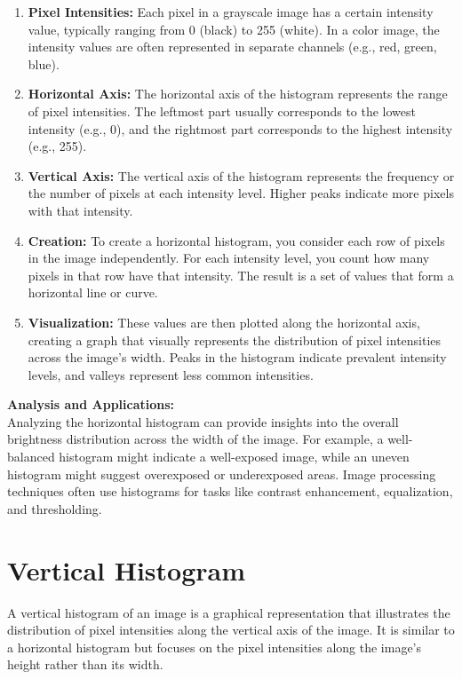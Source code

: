 \documentclass[9pt,twocolumn]{paper-template}
\begin{document}
\begin{enumerate}
	\item \textbf{Pixel Intensities:} Each pixel in a grayscale image has a certain intensity value, typically ranging from 0 (black) to 255 (white). In a color image, the intensity values are often represented in separate channels (e.g., red, green, blue).
	
	\item \textbf{Horizontal Axis:} The horizontal axis of the histogram represents the range of pixel intensities. The leftmost part usually corresponds to the lowest intensity (e.g., 0), and the rightmost part corresponds to the highest intensity (e.g., 255).
	
	\item \textbf{Vertical Axis:} The vertical axis of the histogram represents the frequency or the number of pixels at each intensity level. Higher peaks indicate more pixels with that intensity.
	
	\item \textbf{Creation:} To create a horizontal histogram, you consider each row of pixels in the image independently. For each intensity level, you count how many pixels in that row have that intensity. The result is a set of values that form a horizontal line or curve.
	
	\item \textbf{Visualization:} These values are then plotted along the horizontal axis, creating a graph that visually represents the distribution of pixel intensities across the image's width. Peaks in the histogram indicate prevalent intensity levels, and valleys represent less common intensities.
\end{enumerate}

\textbf{Analysis and Applications:}\\
Analyzing the horizontal histogram can provide insights into the overall brightness distribution across the width of the image. For example, a well-balanced histogram might indicate a well-exposed image, while an uneven histogram might suggest overexposed or underexposed areas. Image processing techniques often use histograms for tasks like contrast enhancement, equalization, and thresholding.

\section*{Vertical Histogram }



A vertical histogram of an image is a graphical representation that illustrates the distribution of pixel intensities along the vertical axis of the image. It is similar to a horizontal histogram but focuses on the pixel intensities along the image's height rather than its width.
\end{document}
